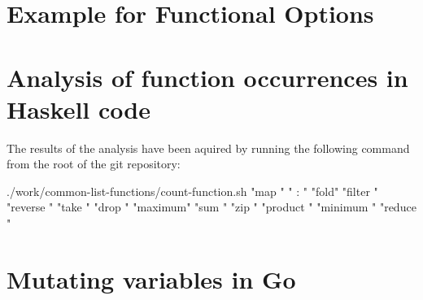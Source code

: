 \documentclass[%
  a4paper,
  twoside,
  numbers=noenddot,
  parskip=half+,
  open=any,
  headsepline,
  english, %
  ba  %
]{zhawthesis}
\newenvironment{code}{\captionsetup{type=listing}}{}
\begin{document}
\backmatter %

\printbibliography

\renewcommand{\lstlistlistingname}{List of source codes}

\lstlistoflistings

\listoffigures

\listoftables
\printglossaries
\cleardoublepage %


\begin{appendices}

\section{Example for Functional Options}\label{appendix:funcopts}
\begin{code}
\end{code}

\section{Analysis of function occurrences in Haskell code}\label{appendix:function-occurrences}
The results of the analysis have been aquired by running the following command
from the root of the git repository\cite{git-repo}:
\begin{bashcode}
./work/common-list-functions/count-function.sh "map " " : " "fold" "filter " "reverse " "take " "drop " "maximum" "sum " "zip " "product " "minimum " "reduce "
\end{bashcode}

\section{Mutating variables in Go}\label{appendix:mutation}
\begin{code}
\end{code}


\end{appendices}
\end{document}

